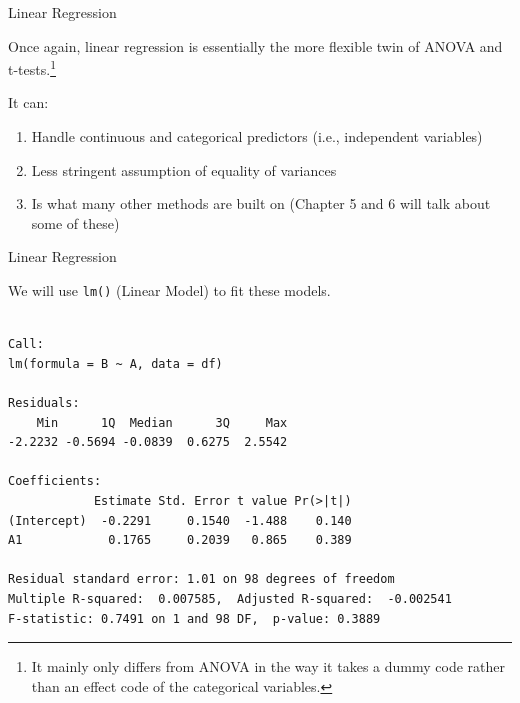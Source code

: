 \begin{frame}{Linear Regression}

\large
Once again, linear regression is essentially the more flexible twin of
ANOVA and
t-tests.\footnote{It mainly only differs from ANOVA in the way it takes a dummy code rather than an effect code of the categorical variables.}

It can:

\begin{enumerate}
\def\labelenumi{\arabic{enumi}.}
\tightlist
\item
  Handle continuous and categorical predictors (i.e., independent
  variables)
\item
  Less stringent assumption of equality of variances
\item
  Is what many other methods are built on (Chapter 5 and 6 will talk
  about some of these)
\end{enumerate}

\end{frame}

\begin{frame}[fragile]{Linear Regression}

We will use \texttt{lm()} (Linear Model) to fit these models.

\small

\begin{Shaded}
\begin{Highlighting}[]
\StringTok{ }\OperatorTok{~}\StringTok{ }
\end{Highlighting}
\end{Shaded}

\begin{verbatim}

Call:
lm(formula = B ~ A, data = df)

Residuals:
    Min      1Q  Median      3Q     Max 
-2.2232 -0.5694 -0.0839  0.6275  2.5542 

Coefficients:
            Estimate Std. Error t value Pr(>|t|)
(Intercept)  -0.2291     0.1540  -1.488    0.140
A1            0.1765     0.2039   0.865    0.389

Residual standard error: 1.01 on 98 degrees of freedom
Multiple R-squared:  0.007585,  Adjusted R-squared:  -0.002541 
F-statistic: 0.7491 on 1 and 98 DF,  p-value: 0.3889
\end{verbatim}

\end{frame}

